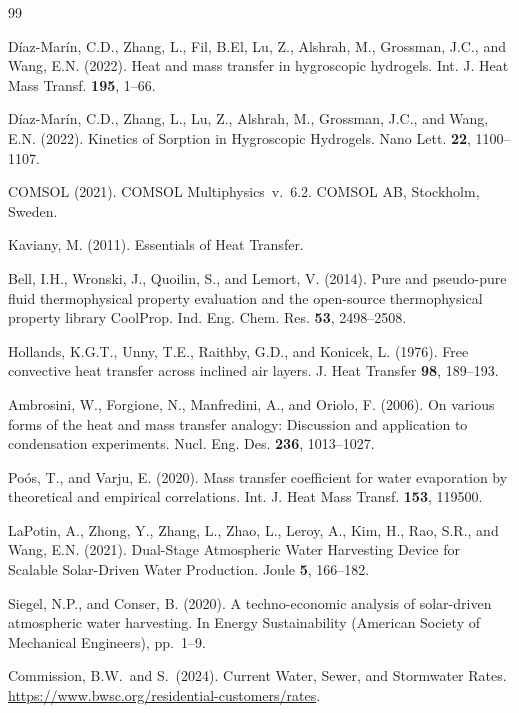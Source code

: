 \documentclass[11pt]{article}
\begin{document}
\begin{thebibliography}{99}

 D{\'i}az-Mar{\'i}n, C.D., Zhang, L., Fil, B.El, Lu, Z., Alshrah, M., Grossman, J.C., and Wang, E.N. (2022). Heat and mass transfer in hygroscopic hydrogels. Int. J. Heat Mass Transf. \textbf{195}, 1--66.

 D{\'i}az-Mar{\'i}n, C.D., Zhang, L., Lu, Z., Alshrah, M., Grossman, J.C., and Wang, E.N. (2022). Kinetics of Sorption in Hygroscopic Hydrogels. Nano Lett. \textbf{22}, 1100--1107.

 COMSOL (2021). COMSOL Multiphysics\textregistered\ v.~6.2. COMSOL AB, Stockholm, Sweden.

 Kaviany, M. (2011). Essentials of Heat Transfer.

 Bell, I.H., Wronski, J., Quoilin, S., and Lemort, V. (2014). Pure and pseudo-pure fluid thermophysical property evaluation and the open-source thermophysical property library CoolProp. Ind. Eng. Chem. Res. \textbf{53}, 2498--2508.

 Hollands, K.G.T., Unny, T.E., Raithby, G.D., and Konicek, L. (1976). Free convective heat transfer across inclined air layers. J. Heat Transfer \textbf{98}, 189--193.

 Ambrosini, W., Forgione, N., Manfredini, A., and Oriolo, F. (2006). On various forms of the heat and mass transfer analogy: Discussion and application to condensation experiments. Nucl. Eng. Des. \textbf{236}, 1013--1027.

 Po{\'o}s, T., and Varju, E. (2020). Mass transfer coefficient for water evaporation by theoretical and empirical correlations. Int. J. Heat Mass Transf. \textbf{153}, 119500.

 LaPotin, A., Zhong, Y., Zhang, L., Zhao, L., Leroy, A., Kim, H., Rao, S.R., and Wang, E.N. (2021). Dual-Stage Atmospheric Water Harvesting Device for Scalable Solar-Driven Water Production. Joule \textbf{5}, 166--182.

 Siegel, N.P., and Conser, B. (2020). A techno-economic analysis of solar-driven atmospheric water harvesting. In Energy Sustainability (American Society of Mechanical Engineers), pp.~1--9.

 Commission, B.W.\ and S.\ (2024). Current Water, Sewer, and Stormwater Rates. \url{https://www.bwsc.org/residential-customers/rates}.


\end{thebibliography}
\end{document}
